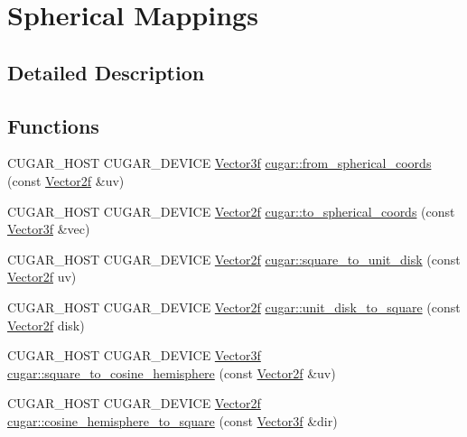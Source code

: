 \hypertarget{group__spherical__mappings}{}\section{Spherical Mappings}
\label{group__spherical__mappings}


\subsection{Detailed Description}
\subsection*{Functions}
\begin{DoxyCompactItemize}
\item 
C\+U\+G\+A\+R\+\_\+\+H\+O\+ST C\+U\+G\+A\+R\+\_\+\+D\+E\+V\+I\+CE \hyperlink{structcugar_1_1_vector}{Vector3f} \hyperlink{group__spherical__mappings_gaa4a68b633ea01fccb331d1a47a8ca8d4}{cugar\+::from\+\_\+spherical\+\_\+coords} (const \hyperlink{structcugar_1_1_vector}{Vector2f} \&uv)
\item 
C\+U\+G\+A\+R\+\_\+\+H\+O\+ST C\+U\+G\+A\+R\+\_\+\+D\+E\+V\+I\+CE \hyperlink{structcugar_1_1_vector}{Vector2f} \hyperlink{group__spherical__mappings_ga180b90ffc2cc3cfcfe63e911ea51a1ab}{cugar\+::to\+\_\+spherical\+\_\+coords} (const \hyperlink{structcugar_1_1_vector}{Vector3f} \&vec)
\item 
C\+U\+G\+A\+R\+\_\+\+H\+O\+ST C\+U\+G\+A\+R\+\_\+\+D\+E\+V\+I\+CE \hyperlink{structcugar_1_1_vector}{Vector2f} \hyperlink{group__spherical__mappings_ga1c891ec8d6e220337a3e39e6dc286e9b}{cugar\+::square\+\_\+to\+\_\+unit\+\_\+disk} (const \hyperlink{structcugar_1_1_vector}{Vector2f} uv)
\item 
C\+U\+G\+A\+R\+\_\+\+H\+O\+ST C\+U\+G\+A\+R\+\_\+\+D\+E\+V\+I\+CE \hyperlink{structcugar_1_1_vector}{Vector2f} \hyperlink{group__spherical__mappings_ga76c7dc3d9379efe5b51c700e28edd8a6}{cugar\+::unit\+\_\+disk\+\_\+to\+\_\+square} (const \hyperlink{structcugar_1_1_vector}{Vector2f} disk)
\item 
C\+U\+G\+A\+R\+\_\+\+H\+O\+ST C\+U\+G\+A\+R\+\_\+\+D\+E\+V\+I\+CE \hyperlink{structcugar_1_1_vector}{Vector3f} \hyperlink{group__spherical__mappings_gab558fab9acdf1ea100f19dff7c6215c4}{cugar\+::square\+\_\+to\+\_\+cosine\+\_\+hemisphere} (const \hyperlink{structcugar_1_1_vector}{Vector2f} \&uv)
\item 
C\+U\+G\+A\+R\+\_\+\+H\+O\+ST C\+U\+G\+A\+R\+\_\+\+D\+E\+V\+I\+CE \hyperlink{structcugar_1_1_vector}{Vector2f} \hyperlink{group__spherical__mappings_ga31615ccce21cd9f1161aaabf87f89b9b}{cugar\+::cosine\+\_\+hemisphere\+\_\+to\+\_\+square} (const \hyperlink{structcugar_1_1_vector}{Vector3f} \&dir)

\end{DoxyCompactItemize}
